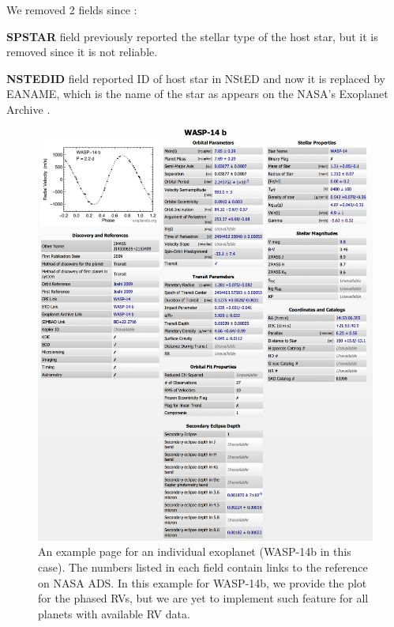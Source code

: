 \documentclass[11pt,preprint]{aastex}
\begin{document}
\begin{CJK*}{UTF8}{gbsn}
We removed 2 fields since \cite{Wright2011}:

{\bf SPSTAR} field previously reported the stellar type of the host
star, but it is removed since it is not reliable. 

{\bf NSTEDID} field reported ID of host star in NStED and now it is
replaced by EANAME, which is the name of the star as appears on the
NASA's Exoplanet Archive \citep{Akeson2013}. 


\begin{figure}[!htb]
\centering
\includegraphics[width=\textwidth]{../fig/wasp-14b.eps}
\caption{An example page for an individual exoplanet (WASP-14b in this
  case). The numbers listed in each field contain links to the
  reference on NASA ADS. In this example for WASP-14b, we provide the plot
  for the phased RVs, but we are yet to implement such feature for all
  planets with available RV data.}
\label{fig:individual}
\end{figure}



\end{CJK*}
\end{document}
